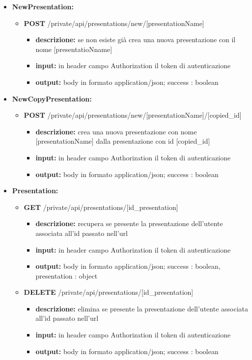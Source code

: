 {{\begin{itemize}
		\item \textbf{NewPresentation:}
			\begin{itemize}
			\item  \textbf{POST} /private/api/presentations/new/[presentationName] 
				\begin{itemize} 
				\item \textbf{descrizione:} se non esiste gi\`{a} crea una nuova presentazione con il nome [presentatioNname]
				\item \textbf{input:} in header campo Authorization il token di autenticazione
				\item \textbf{output:}  body in formato application/json; success : boolean
				\end{itemize}
			\end{itemize}
			
		\item \textbf{NewCopyPresentation:}
			\begin{itemize}
			\item  \textbf{POST} /private/api/presentations/new/[presentationName]/[copied\_id]
				\begin{itemize} 
				\item \textbf{descrizione:} crea una nuova presentazione con nome [presentationName] dalla presentazione con id [copied\_id]
				\item \textbf{input:} in header campo Authorization il token di autenticazione
				\item \textbf{output:}  body in formato application/json; success : boolean
				\end{itemize}
			\end{itemize}

			
		\item \textbf{Presentation:}
			\begin{itemize}
			\item  \textbf{GET} /private/api/presentations/[id\_presentation] 
				\begin{itemize} 
				\item \textbf{descrizione:} recupera se presente la presentazione dell'utente associata all'id passato nell'url
				\item \textbf{input:} in header campo Authorization il token di autenticazione
				\item \textbf{output:} body in formato application/json; success : boolean, presentation : object
				\end{itemize}
				
			\item  \textbf{DELETE} /private/api/presentations/[id\_presentation] 
				\begin{itemize} 
				\item \textbf{descrizione:} elimina se presente la presentazione dell'utente associata all'id passato nell'url
				\item \textbf{input:} in header campo Authorization il token di autenticazione
				\item \textbf{output:} body in formato application/json; success : boolean
				\end{itemize}
			\end{itemize}


\end{itemize}}}
